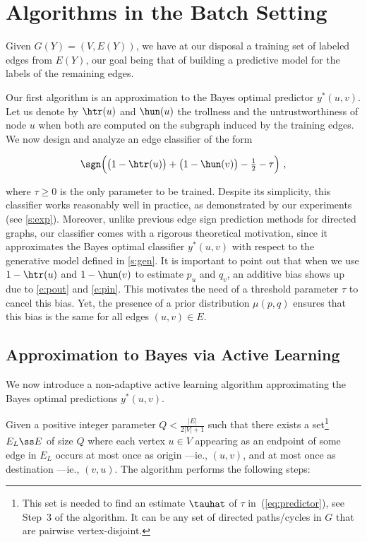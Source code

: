 \section{Algorithms in the Batch Setting}\label{s:algbatch}

Given $G(Y) =(V,E(Y))$, we have at our disposal a training set \trainset{} of labeled edges from
$E(Y)$, our goal being that of building a predictive model for the labels of the remaining edges.

Our first algorithm is an approximation to the Bayes optimal predictor $y^*(u,v)$. Let us denote by
$\htr(u)$ and $\hun(u)$ the trollness and the untrustworthiness of node $u$ when both are computed
on the subgraph induced by the training edges. We now design and analyze an edge classifier of the
form

\begin{equation}
  \label{eq:predictor}
  \sgn\Big(\big(1-\htr(u)\big) + \big(1-\hun(v)\big) - \tfrac{1}{2} -\tau\Big)~,
\end{equation}

where $\tau \ge 0$ is the only parameter to be trained. Despite its simplicity, this classifier
works reasonably well in practice, as demonstrated by our experiments (see \autoref{s:exp}).
Moreover, unlike previous edge sign prediction methods for directed graphs, our classifier comes
with a rigorous theoretical motivation, since it approximates the Bayes optimal classifier
$y^*(u,v)$ with respect to the generative model defined in \autoref{s:gen}. It is important to point
out that when we use $1-\htr(u)$ and $1-\hun(v)$ to estimate $p_u$ and $q_v$, an additive bias shows
up due to \eqref{e:pout} and \eqref{e:pin}. This motivates the need of a threshold parameter $\tau$
to cancel this bias. Yet, the presence of a prior distribution $\mu(p,q)$ ensures that this bias is
the same for all edges $(u,v) \in E$.

\iffalse
\subsection{Approximation to Bayes via Active Learning}\label{ss:active}

We now introduce a non-adaptive active learning algorithm approximating the Bayes optimal
predictions $y^*(u,v)$.

Given a positive integer parameter $Q < \tfrac{|E|}{2|V|+1}$ such that there exists a
set\footnote{This set is needed to find an estimate $\tauhat$ of $\tau$ in~(\ref{eq:predictor}), see
Step~3 of the algorithm. It can be any set of directed paths/cycles in $G$ that are pairwise
vertex-disjoint.} $E_L \ss E$ of size $Q$ where each vertex $u \in V$ appearing as an endpoint of
some edge in $E_L$ occurs at most once as origin ---ie{}., $(u,v)$, and at most once as destination
---ie{}., $(v,u)$. The algorithm performs the following steps:

